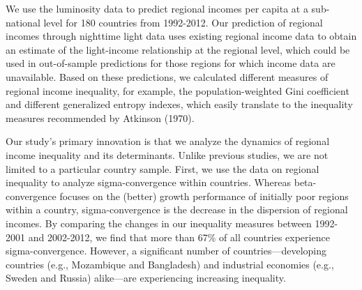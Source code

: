 \documentclass[10pt]{article}
\begin{document}
We use the luminosity data to predict regional incomes per capita at a sub-national level for 180 countries from 1992-2012. 
Our prediction of regional incomes through nighttime light data uses existing regional income data to obtain an estimate of the light-income relationship at the regional level, which could be used in out-of-sample predictions for those regions for which income data are unavailable. 
Based on these predictions, we calculated different measures of regional income inequality, for example, the population-weighted Gini coefficient and different generalized entropy indexes, which easily translate to the inequality measures recommended by Atkinson (1970).

Our study's primary innovation is that we analyze the dynamics of regional income inequality and its determinants. 
Unlike previous studies, we are not limited to a particular country sample. 
First, we use the data on regional inequality to analyze sigma-convergence within countries. 
Whereas beta-convergence focuses on the (better) growth performance of initially poor regions within a country, sigma-convergence is the decrease in the dispersion of regional incomes. 
By comparing the changes in our inequality measures between 1992-2001 and 2002-2012, we find that more than 67\% of all countries experience sigma-convergence. However, a significant number of countries---developing countries (e.g., Mozambique and Bangladesh) and industrial economies (e.g., Sweden and Russia) alike---are experiencing increasing inequality.
\end{document}
